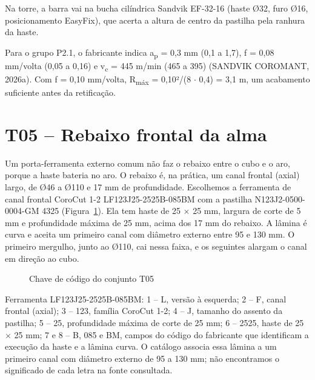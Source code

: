 \noindent Na torre, a barra vai na bucha cilíndrica Sandvik EF-32-16 (haste Ø32, furo Ø16, posicionamento EasyFix), que acerta a altura de centro da pastilha pela ranhura da haste.

Para o grupo P2.1, o fabricante indica a\textsubscript{p} = 0,3 mm (0,1 a 1,7), f = 0,08 mm/volta (0,05 a 0,16) e v\textsubscript{c} = 445 m/min (465 a 395) (SANDVIK COROMANT, 2026a). Com f = 0,10 mm/volta, R\textsubscript{máx} = 0,10²/(8 $\cdot$ 0,4) = 3,1 \textmu{}m, um acabamento suficiente antes da retificação.

\section{T05 – Rebaixo frontal da alma}

Um porta-ferramenta externo comum não faz o rebaixo entre o cubo e o aro, porque a haste bateria no aro. O rebaixo é, na prática, um canal frontal (axial) largo, de Ø46 a Ø110 e 17 mm de profundidade. Escolhemos a ferramenta de canal frontal CoroCut 1-2 LF123J25-2525B-085BM com a pastilha N123J2-0500-0004-GM 4325 (Figura~\ref{fig:chaveT05}). Ela tem haste de 25 $\times$ 25 mm, largura de corte de 5 mm e profundidade máxima de 25 mm, acima dos 17 mm do rebaixo. A lâmina é curva e aceita um primeiro canal com diâmetro externo entre 95 e 130 mm. O primeiro mergulho, junto ao Ø110, cai nessa faixa, e os seguintes alargam o canal em direção ao cubo.

\begin{figure}[H]
\centering
\caption{Chave de código do conjunto T05}\label{fig:chaveT05}
\par\medskip
{}
\end{figure}

\noindent Ferramenta LF123J25-2525B-085BM: 1 – L, versão à esquerda; 2 – F, canal frontal (axial); 3 – 123, família CoroCut 1-2; 4 – J, tamanho do assento da pastilha; 5 – 25, profundidade máxima de corte de 25 mm; 6 – 2525, haste de 25 $\times$ 25 mm; 7 e 8 – B, 085 e BM, campos do código do fabricante que identificam a execução da haste e a lâmina curva. O catálogo associa essa lâmina a um primeiro canal com diâmetro externo de 95 a 130 mm; não encontramos o significado de cada letra na fonte consultada.

